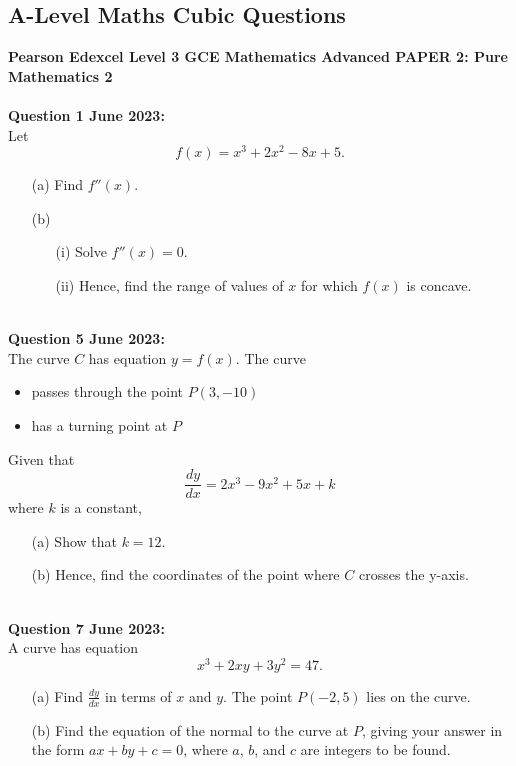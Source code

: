 \documentclass[12pt]{article}
\begin{document}
\subsection{A-Level Maths Cubic Questions}

\textbf{Pearson Edexcel Level 3 GCE Mathematics
Advanced PAPER 2: Pure Mathematics 2}\\\\
\textbf{Question 1 June 2023:}\\
Let \[f(x) = x^3 + 2x^2 - 8x + 5.\]
\begin{enumerate}
    \item[(a)] Find \( f''(x) \). 
    \item[(b)] 
    \begin{enumerate}
        \item[(i)] Solve \( f''(x) = 0 \).
        \item[(ii)] Hence, find the range of values of \( x \) for which \( f(x) \) is concave.\\\\
    \end{enumerate}
\end{enumerate}

\textbf{Question 5 June 2023:}\\
The curve \( C \) has equation \( y = f(x) \). The curve
\begin{itemize}
    \item passes through the point \( P(3, -10) \)
    \item has a turning point at \( P \)
\end{itemize}

Given that 
\[\frac{dy}{dx} = 2x^3 - 9x^2 + 5x + k\]
where \( k \) is a constant,
\begin{enumerate}
    \item[(a)] Show that \( k = 12 \).
    \item[(b)] Hence, find the coordinates of the point where \( C \) crosses the y-axis.\\\\
\end{enumerate}

\textbf{Question 7 June 2023:}\\
A curve has equation
\[x^3 + 2xy + 3y^2 = 47.\]
\begin{enumerate}
    \item[(a)] Find \( \frac{dy}{dx} \) in terms of \( x \) and \( y \). 
    The point \( P(-2, 5) \) lies on the curve.    
    \item[(b)] Find the equation of the normal to the curve at \( P \), giving your answer in the form \( ax + by + c = 0 \), where \( a \), \( b \), and \( c \) are integers to be found.\\\\
\end{enumerate}
\end{document}
